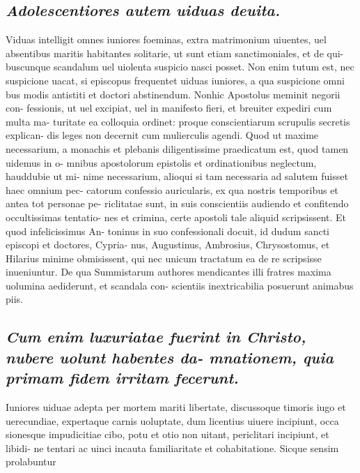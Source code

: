 \documentclass{article}
\begin{document}
\begin{pages}
\subsection*{\textit{Adolescentiores autem uiduas deuita. }}\pstart Viduas intelligit omnes iuniores foeminas, extra matrimonium uiuentes, uel absentibus maritis habitantes solitarie, ut sunt etiam sanctimoniales, et de qui- buscunque scandalum uel uiolenta suspicio nasci posset. Non enim tutum est, nec suspicione uacat, si episcopus frequentet uiduas iuniores, a qua suspicione omni bus modis antistiti et doctori abstinendum. Nonhic Apostolus meminit negorii con- fessionis, ut uel excipiat, uel in manifesto fieri, et breuiter expediri cum multa ma- turitate ea colloquia ordinet: proque conscientiarum scrupulis secretis explican- dis leges non decernit cum mulierculis agendi. Quod ut maxime necessarium, a monachis et plebanis diligentissime praedicatum est, quod tamen uidemus in o- mnibus apostolorum epistolis et ordinationibus neglectum, hauddubie ut mi- nime necessarium, alioqui si tam necessaria ad salutem fuisset haec omnium pec- catorum confessio auricularis, ex qua nostris temporibus et antea tot personae pe- riclitatae sunt, in suis conscientiis audiendo et confitendo occultissimas tentatio- nes et crimina, certe apostoli tale aliquid scripsissent. Et quod infelicissimus An- toninus in suo confessionali docuit, id dudum sancti episcopi et doctores, Cypria- nus, Augustinus, Ambrosius, Chrysostomus, et Hilarius minime obmisissent, qui nec unicum tractatum ea de re scripsisse inueniuntur. De qua Summistarum authores mendicantes illi fratres maxima uolumina aediderunt, et scandala con- scientiis inextricabilia posuerunt animabus piis.  \pend
{}
{}
\subsection*{\textit{Cum enim luxuriatae fuerint in Christo, nubere uolunt habentes da- mnationem, quia primam fidem irritam fecerunt. }}\pstart Iuniores uiduae adepta per mortem mariti libertate, discussoque timoris iugo et uerecundiae, expertaque carnis uoluptate, dum licentius uiuere incipiunt, occa sionesque impudicitiae cibo, potu et otio non uitant, periclitari incipiunt, et libidi- ne tentari ac uinci incauta familiaritate et cohabitatione. Sicque sensim prolabuntur  \pend

\end{pages}
\end{document}
